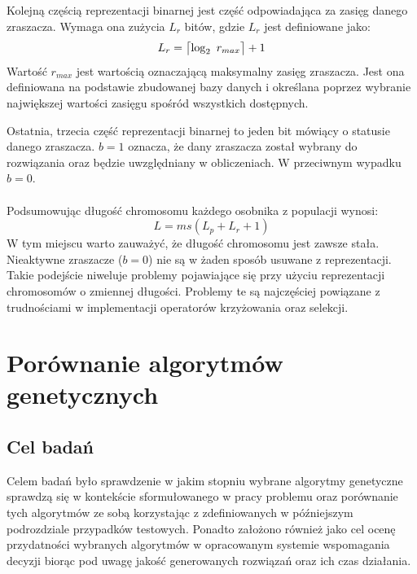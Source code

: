 \documentclass[twoside]{iisthesis}
\begin{document}
Kolejną częścią reprezentacji binarnej jest część odpowiadająca za zasięg danego zraszacza. Wymaga ona zużycia $L_{r}$ bitów, gdzie $L_{r}$ jest definiowane jako:
\begin{equation}
	L_{r} = \ceil[\big]{\log_{2} \text{ } r_{max}} + 1
\end{equation}
Wartość $r_{max}$ jest wartością oznaczającą maksymalny zasięg zraszacza. Jest ona definiowana na podstawie zbudowanej bazy danych i określana poprzez wybranie największej wartości zasięgu spośród wszystkich dostępnych.

Ostatnia, trzecia część reprezentacji binarnej to jeden bit mówiący o statusie danego zraszacza. $b = 1$ oznacza, że dany zraszacza został wybrany do rozwiązania oraz będzie uwzględniany w obliczeniach. W przeciwnym wypadku $b = 0$.\\\\
Podsumowując długość chromosomu każdego osobnika z populacji wynosi:
\begin{equation}
	L = ms(L_{p} + L_{r} + 1)
\end{equation}
W tym miejscu warto zauważyć, że długość chromosomu jest zawsze stała. Nieaktywne zraszacze ($b=0$) nie są w żaden sposób usuwane z reprezentacji. Takie podejście niweluje problemy pojawiające się przy użyciu reprezentacji chromosomów o zmiennej długości. Problemy te są najczęściej powiązane z trudnościami w implementacji operatorów krzyżowania oraz selekcji.
\section{Porównanie algorytmów genetycznych}
\subsection{Cel badań}
Celem badań było sprawdzenie w jakim stopniu wybrane algorytmy genetyczne sprawdzą się w kontekście sformułowanego w pracy problemu oraz porównanie tych algorytmów ze sobą korzystając z zdefiniowanych w późniejszym podrozdziale przypadków testowych. Ponadto założono również jako cel ocenę przydatności wybranych algorytmów w opracowanym systemie wspomagania decyzji biorąc pod uwagę jakość generowanych rozwiązań oraz ich czas działania.
\end{document}
